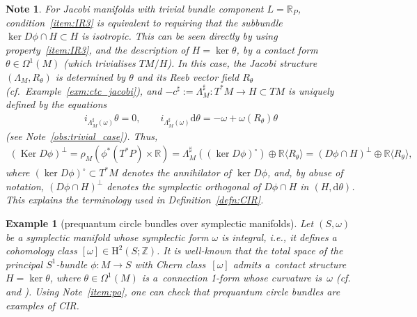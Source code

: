\documentclass[10pt,a4paper]{amsart}
\numberwithin{equation}{section}
\newtheorem{Note}[Theorem]{Note}
\newtheorem{Example}[Theorem]{Example}
\newcommand{\Ker}{\operatorname{Ker}} %
\newcommand{\de}{\mathrm{d}} %
\newcommand{\SM}{(S,\omega)} %
\newcommand{\HH}{\mathrm{H}}
\newcommand{\RR}{\mathbb{R}}
\newcommand{\ZZ}{\mathbb{Z}}
\begin{document}
\begin{Note}\label{item:po} For Jacobi manifolds with trivial bundle component $L=\RR_P$, condition~\ref{item:IR3} is equivalent to requiring that the subbundle $ \ker D\phi \cap H\subset H$ is isotropic. This can be seen directly by using property~\ref{item:IR3}, and the description of $H=\ker\theta$, by a contact form $\theta\in\Omega^1(M)$ (which trivialises $TM/H$). In this case, the Jacobi structure $(\Lambda_M, R_{\theta})$ is determined by $\theta$ and its Reeb vector f\/ield $R_{\theta}$ (cf.\ Example~\ref{exm:ctc_jacobi}), and $-c^\sharp:=\Lambda_M^\sharp\colon T^*M\to H\subset TM$ is uniquely def\/ined by the equations
 \begin{gather*}i_{\Lambda_M^\sharp(\omega)}\theta=0,\qquad i_{\Lambda_M^\sharp(\omega)}\de\theta=-\omega+\omega(R_{\theta})\theta\end{gather*}
 (see Note~\eqref{obs:trivial_case}). Thus,
 \begin{gather*}(\Ker D\phi)^{\perp}=\rho_M(\phi^*(T^*P)\times\RR)=\Lambda_M^\sharp((\ker
 D\phi)^\circ)\oplus \RR \langle R_{\theta} \rangle=(D\phi \cap H)^{\perp}\oplus \RR \langle R_{\theta} \rangle, \end{gather*}
where $(\ker D\phi)^\circ\subset T^*M$ denotes the annihilator of $\ker D\phi$, and, by abuse of notation, $(D\phi \cap H)^{\perp}$ denotes the symplectic orthogonal of $D\phi \cap H$ in $(H,\de\theta)$. This explains the terminology used in Def\/inition~\ref{defn:CIR}.
\end{Note}

\begin{Example}[prequantum circle bundles over symplectic manifolds]\label{sec:motiv-preq-circle} Let $\SM$ be a symplectic manifold whose symplectic form $\omega$ is {\it integral}, i.e., it def\/ines a cohomology class $[\omega] \in \HH^2(S;\ZZ)$. It is well-known that the total space of the principal $S^1$-bundle $\phi \colon M \to S$ with Chern class~$[\omega]$ admits a~contact structure $H = \ker \theta$, where $\theta \in \Omega^1(M)$ is a~connection 1-form whose curvature is~$\omega$ (cf.\ \cite[Section~7.2]{geiges_book} and \cite[Example~3.48]{mcduff_salamon}). Using Note~\eqref{item:po}, one can check that prequantum circle bundles are examples of CIR.
\end{Example}
\end{document}
